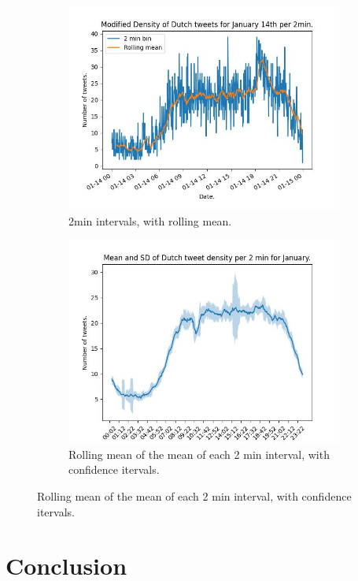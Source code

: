 \documentclass[9pt]{article}
\begin{document}
\begin{figure}[h!]
    \center
    \begin{subfigure}[b]{0.45\textwidth}
        \includegraphics[scale=0.3]{figures/JanNLD14roll.jpeg}
        \caption{2min intervals, with rolling mean.} 
        \label{fig:2a}
    \end{subfigure}
    \begin{subfigure}[b]{0.45\textwidth}
        \includegraphics[scale=0.3]{figures/JanNLdayfill.jpeg}
        \caption{Rolling mean of the mean of each 2 min interval, with confidence itervals.} 
        \label{fig:2b}
    \end{subfigure}
\end{figure}

\section{Conclusion}
\end{document}
